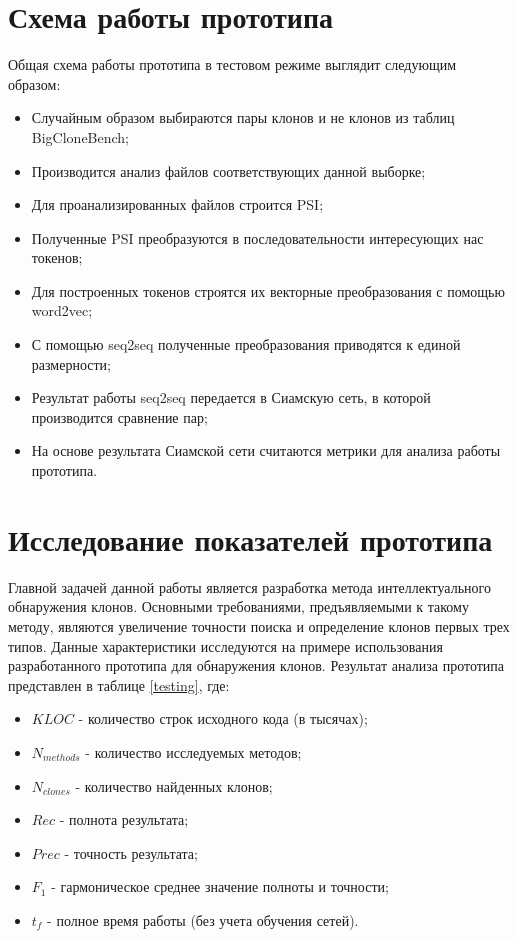 \section{Схема работы прототипа}

Общая схема работы прототипа в тестовом режиме выглядит следующим образом:

\begin{itemize}
\setlength\itemsep{0mm}
\item Случайным образом выбираются пары клонов и не клонов из таблиц BigCloneBench;
\item Производится анализ файлов соответствующих данной выборке;
\item Для проанализированных файлов строится PSI;
\item Полученные PSI преобразуются в последовательности интересующих нас токенов;
\item Для построенных токенов строятся их векторные преобразования с помощью word2vec;
\item С помощью seq2seq полученные преобразования приводятся к единой размерности;
\item Результат работы seq2seq передается в Сиамскую сеть, в которой производится сравнение пар;
\item На основе результата Сиамской сети считаются метрики для анализа работы прототипа.
\end{itemize}

\section{Исследование показателей прототипа}

Главной задачей данной работы является разработка метода интеллектуального обнаружения клонов. Основными требованиями, предъявляемыми к такому методу, являются увеличение точности поиска и определение клонов первых трех типов. Данные характеристики исследуются на примере использования разработанного прототипа для обнаружения клонов. Результат анализа прототипа представлен в таблице \ref{testing}, где:

\begin{itemize}
\setlength\itemsep{0mm}
\item \(KLOC\) - количество строк исходного кода (в тысячах);
\item \(N_{methods}\) - количество исследуемых методов;
\item \(N_{clones}\) - количество найденных клонов;
\item \(Rec\) - полнота результата;
\item \(Prec\) - точность результата;
\item \(F_1\) - гармоническое среднее значение полноты и точности;
\item \(t_f\) - полное время работы (без учета обучения сетей).
\end{itemize}


